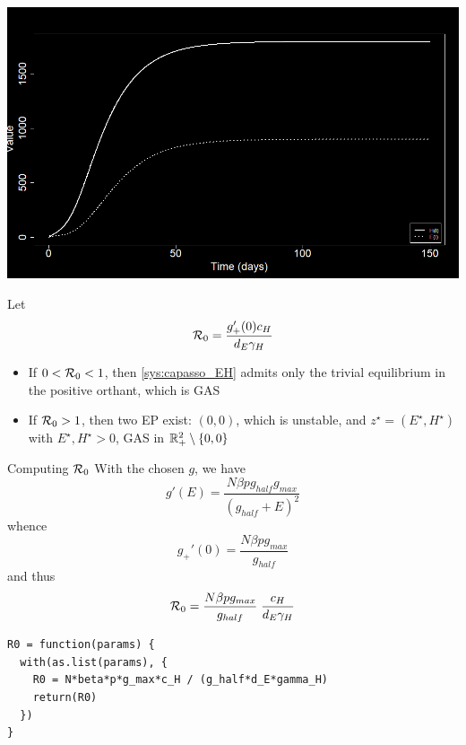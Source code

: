 \documentclass[aspectratio=169]{beamer}
\begin{document}
\begin{frame}
  \begin{center}
    \includegraphics[width=\textwidth]{../FIGS/Capasso_ETP_1}
  \end{center}
\end{frame}

\begin{frame}
  Let
  \begin{equation}
    \label{eq:R0_capasso}
    \mathcal{R}_0 = \frac{g'_+(0)c_H}{d_E\gamma_H}
  \end{equation}
  \begin{theorem}
    \begin{itemize}
      \item If $0<\mathcal{R}_0<1$, then \eqref{sys:capasso_EH} admits only the trivial equilibrium in the positive orthant, which is GAS
      \item If $\mathcal{R}_0>1$, then two EP exist: $(0,0)$, which is unstable, and $z^\star=(E^\star,H^\star)$ with $E^\star,H^\star>0$, GAS in $\mathbb{R}_+^2\setminus\{0,0\}$
    \end{itemize}
  \end{theorem}
\end{frame}

\begin{frame}[fragile]{Computing $\mathcal{R}_0$}
  With the chosen $g$, we have
  \[
    g'(E) = 
    \frac{N \beta pg_{half} g_{max}}
    {(g_{half}+E)^2}
  \]
  whence
  \[
    g_+'(0)=\frac{N \beta pg_{max}}
    {g_{half}}
  \]
  and thus
  \begin{equation}
    \mathcal{R}_0 = \frac{N \beta pg_{max}}
    {g_{half}}\;\frac{c_H}{d_E\gamma_H}
  \end{equation}
\begin{lstlisting}
R0 = function(params) {
  with(as.list(params), {
    R0 = N*beta*p*g_max*c_H / (g_half*d_E*gamma_H)
    return(R0)
  })
}  
\end{lstlisting}
\end{frame}
\end{document}
